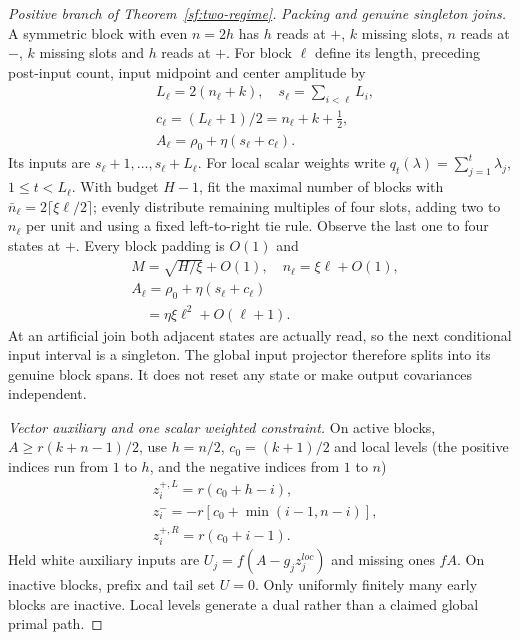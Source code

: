 \documentclass[journal]{IEEEtran}
\begin{document}
\begin{proof}[Positive branch of Theorem~\ref{sf:two-regime}]
\par\smallskip\noindent\textit{Packing and genuine singleton joins.}\enspace 
A symmetric block with even $n=2h$ has $h$ reads at $+$, $k$ missing slots,
$n$ reads at $-$, $k$ missing slots and $h$ reads at $+$.
For block $\ell$ define its length, preceding post-input count,
input midpoint and center amplitude by
\begin{equation}\label{sf:block}
\begin{aligned}
&L_\ell=2(n_\ell+k),\quad s_\ell=\sum_{i<\ell}L_i,\\
&c_\ell=(L_\ell+1)/2=n_\ell+k+\tfrac12,\\
&A_\ell=\rho_0+\eta(s_\ell+c_\ell).
\end{aligned}
\end{equation}
Its inputs are $s_\ell+1,\ldots,s_\ell+L_\ell$. For local scalar weights
write $q_t(\lambda)=\sum_{j=1}^t\lambda_j$, $1\le t<L_\ell$.
With budget $H-1$, fit the maximal number of blocks with
$\bar n_\ell=2\lceil\xi\ell/2\rceil$; evenly distribute remaining multiples of
four slots, adding two to $n_\ell$ per unit and using a fixed left-to-right
tie rule. Observe the last one to four states at $+$.
Every block padding is $O(1)$ and
\[
\begin{aligned}
&M=\sqrt{H/\xi}+O(1),\quad n_\ell=\xi\ell+O(1),\\
&A_\ell=\rho_0+\eta(s_\ell+c_\ell)\\
&\quad=\eta\xi\ell^2+O(\ell+1).
\end{aligned}
\]
At an artificial join both adjacent states are actually read, so the next
conditional input interval is a singleton.
The global input projector therefore splits into its genuine block spans.
It does not reset any state or make output covariances independent.

\par\smallskip\noindent\textit{Vector auxiliary and one scalar weighted constraint.}\enspace 
On active blocks, $A\ge r(k+n-1)/2$, use $h=n/2$, $c_0=(k+1)/2$ and local levels (the positive indices run from $1$ to $h$,
and the negative indices from $1$ to $n$)
\[
\begin{aligned}
&z_i^{+,L}=r(c_0+h-i),\\
&z_i^-=-r[c_0+\min(i-1,n-i)],\\
&z_i^{+,R}=r(c_0+i-1).
\end{aligned}
\]
Held white auxiliary inputs are $U_j=f(A-g_jz_j^{loc})$ and missing ones $fA$.
On inactive blocks, prefix and tail set $U=0$.
Only uniformly finitely many early blocks are inactive.
Local levels generate a dual rather than a claimed global primal path.


\end{proof}
\end{document}
